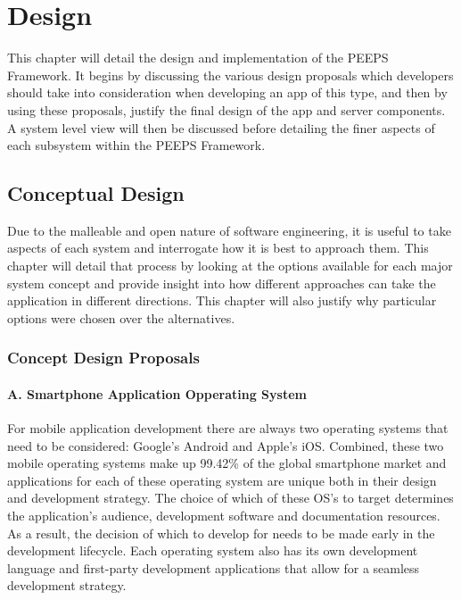\chapter{Design}
This chapter will detail the design and implementation of the PEEPS Framework. It begins by discussing the various design proposals which developers should take into consideration when developing an app of this type, and then by using these proposals, justify the final design of the app and server components. A system level view will then be discussed before detailing the finer aspects of each subsystem within the PEEPS Framework.

\section{Conceptual Design}
Due to the malleable and open nature of software engineering, it is useful to take aspects of each system and interrogate how it is best to approach them. This chapter will detail that process by looking at the options available for each major system concept and provide insight into how different approaches can take the application in different directions. This chapter will also justify why particular options were chosen over the alternatives.  

\subsection{Concept Design Proposals}

\subsubsection{A. Smartphone Application Opperating System}

For mobile application development there are always two operating systems that need to be considered: Google’s Android and Apple’s iOS. Combined, these two mobile operating systems make up 99.42\% of the global smartphone market \cite{StatCounter} and applications for each of these operating system are unique both in their design and development strategy. The choice of which of these OS’s to target determines the application’s audience, development software and documentation resources. As a result, the decision of which to develop for needs to be made early in the development lifecycle. Each operating system also has its own development language and first-party development applications that allow for a seamless development strategy. 

